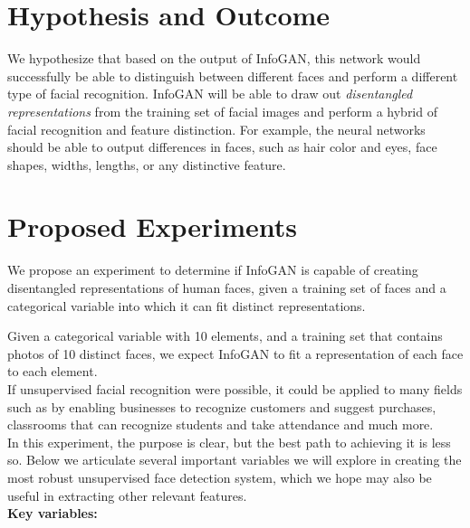 \documentclass{article}
\begin{document}
\section{Hypothesis and Outcome}
We hypothesize that based on the output of InfoGAN, this network would successfully be able to distinguish between different faces and perform a different type of facial recognition.  InfoGAN will be able to draw out \textit{disentangled representations} from the training set of facial images and perform a hybrid of facial recognition and feature distinction. For example, the neural networks should be able to output differences in faces, such as hair color and eyes, face shapes, widths, lengths, or any distinctive feature.

\section{Proposed Experiments}
We propose an experiment to determine if InfoGAN is capable of creating disentangled representations of human faces, given a training set of faces and a categorical variable into which it can fit distinct representations.

Given a categorical variable with 10 elements, and a training set that contains photos of 10 distinct faces, we expect InfoGAN to fit a representation of each face to each element.\\

If unsupervised facial recognition were possible, it could be applied to many fields such as by enabling businesses to recognize customers and suggest purchases, classrooms that can  recognize students and take attendance and much more. \\

In this experiment, the purpose is clear, but the best path to achieving it is less so.  Below we articulate several important variables we will explore in creating the most robust unsupervised face detection system, which we hope may also be useful in extracting other relevant features.\\

\textbf{Key variables:}
\end{document}
